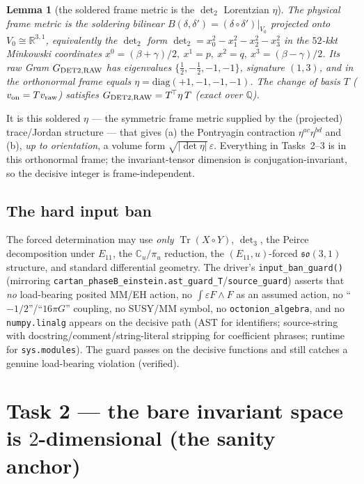 \documentclass[11pt]{article}
\newcommand{\R}{\mathbb{R}}
\newcommand{\Q}{\mathbb{Q}}
\newcommand{\half}{\tfrac12}
\newcommand{\Tr}{\operatorname{Tr}}
\newcommand{\so}{\mathfrak{so}}
\theoremstyle{definition}\newtheorem{remark}{Remark}
\theoremstyle{definition}\newtheorem{definition}{Definition}
\theoremstyle{plain}\newtheorem{proposition}{Proposition}
\theoremstyle{plain}\newtheorem{lemma}{Lemma}
\begin{document}
\begin{lemma}[the soldered frame metric is the $\det_2$ Lorentzian $\eta$]\label{lem:eta}
The physical frame metric is the soldering bilinear $B(\delta,\delta')=(\delta\circ
\delta')|_{V_0}$ projected onto $V_0\cong\R^{3,1}$, equivalently the $\det_2$ form
$\det\nolimits_2=x_0^2-x_1^2-x_2^2-x_3^2$ in the $52$-kkt Minkowski coordinates
$x^0=(\beta+\gamma)/2,\ x^1=p,\ x^2=q,\ x^3=(\beta-\gamma)/2$. Its raw Gram
$G_{\rm DET2,RAW}$ has eigenvalues $\{\half,-\half,-1,-1\}$, signature $(1,3)$, and in
the orthonormal frame equals $\eta=\mathrm{diag}(+1,-1,-1,-1)$. The change of basis
$T$ ($v_{\rm on}=Tv_{\rm raw}$) satisfies $G_{\rm DET2,RAW}=T^{\!\top}\eta\,T$ (exact
over $\Q$).
\end{lemma}

It is this soldered $\eta$ --- the symmetric frame metric supplied by the (projected)
trace/Jordan structure --- that gives (a) the Pontryagin contraction
$\eta^{ac}\eta^{bd}$ and (b), \emph{up to orientation}, a volume form
$\sqrt{|\det\eta|}\,\varepsilon$. Everything in Tasks~2--3 is in this orthonormal
frame; the invariant-tensor dimension is conjugation-invariant, so the decisive
integer is frame-independent.

\subsection{The hard input ban}
The forced determination may use \emph{only} $\Tr(X\circ Y)$, $\det\nolimits_3$, the
Peirce decomposition under $E_{11}$, the $\mathbb{C}_u/\pi_u$ reduction, the
$(E_{11},u)$-forced $\so(3,1)$ structure, and standard differential geometry. The
driver's \texttt{input\_ban\_guard()} (mirroring
\texttt{cartan\_phaseB\_einstein.ast\_guard\_T}/\texttt{source\_guard}) asserts that
\emph{no} load-bearing posited MM/EH action, no $\int\varepsilon F\wedge F$ as an
assumed action, no ``$-1/2$''/``$16\pi G$'' coupling, no SUSY/MM symbol, no
\texttt{octonion\_algebra}, and no \texttt{numpy.linalg} appears on the decisive path
(AST for identifiers; source-string with docstring/comment/string-literal stripping
for coefficient phrases; runtime for \texttt{sys.modules}). The guard passes on the
decisive functions and still catches a genuine load-bearing violation (verified).

\section{Task 2 --- the bare invariant space is $2$-dimensional (the sanity anchor)}
\end{document}
